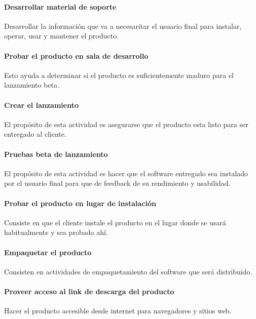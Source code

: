 \paragraph{Desarrollar material de soporte}
Desarrollar la información que va a necesaritar el usuario final para instalar, operar, usar y mantener el producto.
\paragraph{Probar el producto en sala de desarrollo}
Esto ayuda a determinar si el producto es suficientemente maduro para el lanzamiento beta.
\paragraph{Crear el lanzamiento}
El propósito de esta actividad es asegurarse que el producto esta listo para ser entregado al cliente.
\paragraph{Pruebas beta de lanzamiento}
El propósito de esta actividad es hacer que el software entregado sea instalado por el usuario final para que de feedback de su rendimiento y usabilidad.
\paragraph{Probar el producto en lugar de instalación}
Consiste en que el cliente instale el producto en el lugar donde se usará habitualmente y sea probado ahí.
\paragraph{Empaquetar el producto}
Consisten en actividades de empaquetamiento del software que será distribuido.
\paragraph{Proveer acceso al link de descarga del producto}
Hacer el producto accesible desde internet para navegadores y sitios web.
